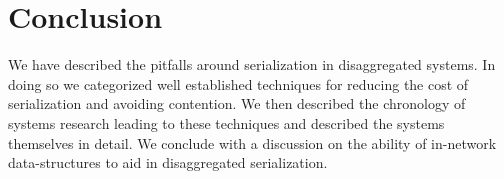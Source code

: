 
\section{Conclusion}

We have described the pitfalls around serialization in disaggregated systems. In
doing so we categorized well established techniques for reducing the cost of
serialization and avoiding contention. We then described the chronology of
systems research leading to these techniques and described the systems
themselves in detail. We conclude with a discussion on the ability of in-network
data-structures to aid in disaggregated serialization.


